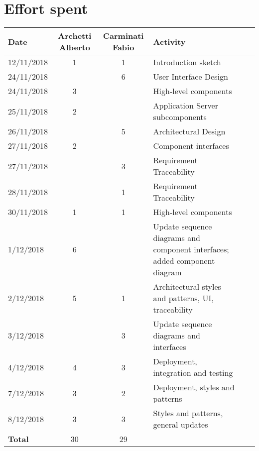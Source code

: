 \documentclass[../DD0.tex]{subfiles}
\newcommand{\addHours}[4]{#1 & #2 & #3 & #4 \\\hline}
\begin{document}
\section*{Effort spent}
\label{sec:effort}
  \begin{table}[h!]
  \centering
  \begin{tabularx}{\linewidth}{|l|c|c|X|Xl}
    \hline
    \textbf{Date}  & \textbf{Archetti Alberto} & \textbf{Carminati Fabio} & \textbf{Activity} \\ \hline

    \addHours{12/11/2018}{1}{1}{Introduction sketch}

    \addHours{24/11/2018}{}{6}{User Interface Design}

    \addHours{24/11/2018}{3}{}{High-level components}

    \addHours{25/11/2018}{2}{}{Application Server subcomponents}

    \addHours{26/11/2018}{}{5}{Architectural Design}

    \addHours{27/11/2018}{2}{}{Component interfaces}

    \addHours{27/11/2018}{}{3}{Requirement Traceability}

    \addHours{28/11/2018}{}{1}{Requirement Traceability}

    \addHours{30/11/2018}{1}{1}{High-level components}

    \addHours{1/12/2018}{6}{}{Update sequence diagrams and component interfaces; added component diagram}

    \addHours{2/12/2018}{5}{1}{Architectural styles and patterns, UI, traceability}

    \addHours{3/12/2018}{}{3}{Update sequence diagrams and interfaces}

    \addHours{4/12/2018}{4}{3}{Deployment, integration and testing}

    \addHours{7/12/2018}{3}{2}{Deployment, styles and patterns}

    \addHours{8/12/2018}{3}{3}{Styles and patterns, general updates}

    \addHours{\textbf{Total}}{30}{29}{}
    
  \end{tabularx}
\end{table}
\end{document}
